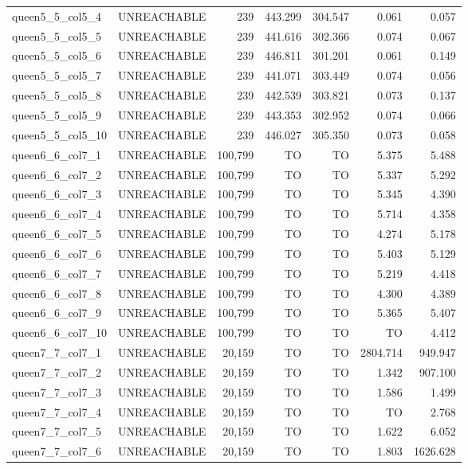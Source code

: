 \begin{tabular}{llr|rrrr}
  queen5\_5\_col5\_4 & UNREACHABLE & 239 & 443.299 & 304.547 & 0.061 & 0.057 \\
  queen5\_5\_col5\_5 & UNREACHABLE & 239 & 441.616 & 302.366 & 0.074 & 0.067 \\
  queen5\_5\_col5\_6 & UNREACHABLE & 239 & 446.811 & 301.201 & 0.061 & 0.149 \\
  queen5\_5\_col5\_7 & UNREACHABLE & 239 & 441.071 & 303.449 & 0.074 & 0.056 \\
  queen5\_5\_col5\_8 & UNREACHABLE & 239 & 442.539 & 303.821 & 0.073 & 0.137 \\
  queen5\_5\_col5\_9 & UNREACHABLE & 239 & 443.353 & 302.952 & 0.074 & 0.066 \\ \hline
  queen5\_5\_col5\_10 & UNREACHABLE & 239 & 446.027 & 305.350 & 0.073 & 0.058 \\
  queen6\_6\_col7\_1 & UNREACHABLE & 100,799 & TO & TO & 5.375 & 5.488 \\
  queen6\_6\_col7\_2 & UNREACHABLE & 100,799 & TO & TO & 5.337 & 5.292 \\
  queen6\_6\_col7\_3 & UNREACHABLE & 100,799 & TO & TO & 5.345 & 4.390 \\
  queen6\_6\_col7\_4 & UNREACHABLE & 100,799 & TO & TO & 5.714 & 4.358 \\
  queen6\_6\_col7\_5 & UNREACHABLE & 100,799 & TO & TO & 4.274 & 5.178 \\
  queen6\_6\_col7\_6 & UNREACHABLE & 100,799 & TO & TO & 5.403 & 5.129 \\
  queen6\_6\_col7\_7 & UNREACHABLE & 100,799 & TO & TO & 5.219 & 4.418 \\
  queen6\_6\_col7\_8 & UNREACHABLE & 100,799 & TO & TO & 4.300 & 4.389 \\
  queen6\_6\_col7\_9 & UNREACHABLE & 100,799 & TO & TO & 5.365 & 5.407 \\ \hline
  queen6\_6\_col7\_10 & UNREACHABLE & 100,799 & TO & TO & TO & 4.412 \\
  queen7\_7\_col7\_1 & UNREACHABLE & 20,159 & TO & TO & 2804.714 & 949.947 \\
  queen7\_7\_col7\_2 & UNREACHABLE & 20,159 & TO & TO & 1.342 & 907.100 \\
  queen7\_7\_col7\_3 & UNREACHABLE & 20,159 & TO & TO & 1.586 & 1.499 \\
  queen7\_7\_col7\_4 & UNREACHABLE & 20,159 & TO & TO & TO & 2.768 \\
  queen7\_7\_col7\_5 & UNREACHABLE & 20,159 & TO & TO & 1.622 & 6.052 \\
  queen7\_7\_col7\_6 & UNREACHABLE & 20,159 & TO & TO & 1.803 & 1626.628 \\

\end{tabular}
